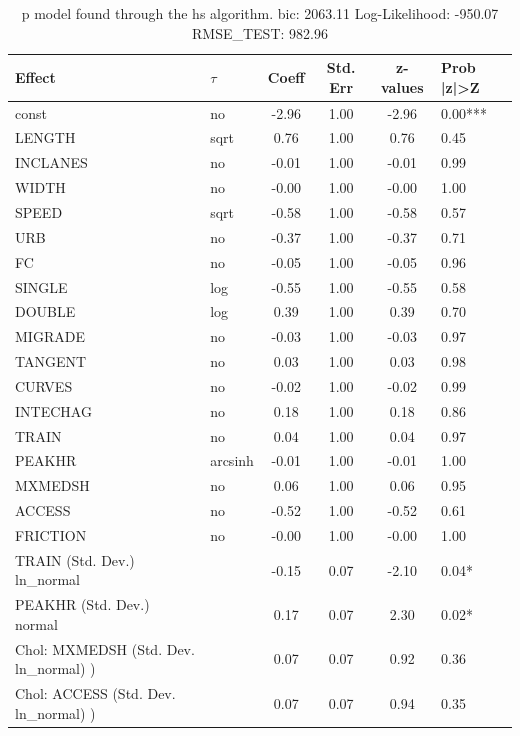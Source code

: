 \begin{table}
	\caption{p model found through the hs algorithm. bic: 2063.11 Log-Likelihood: -950.07 RMSE_TEST: 982.96}
	\begin{center}
		\begin{tabular}{|l|l|c|c|c|l|}
			\hline
			Effect & $\tau$ & Coeff & Std. Err & z-values & Prob |z|>Z \\
			\hline
			const & no & -2.96 & 1.00 & -2.96 & 0.00*** \\
			\hline
			LENGTH & sqrt & 0.76 & 1.00 & 0.76 & 0.45 \\
			\hline
			INCLANES & no & -0.01 & 1.00 & -0.01 & 0.99 \\
			\hline
			WIDTH & no & -0.00 & 1.00 & -0.00 & 1.00 \\
			\hline
			SPEED & sqrt & -0.58 & 1.00 & -0.58 & 0.57 \\
			\hline
			URB & no & -0.37 & 1.00 & -0.37 & 0.71 \\
			\hline
			FC & no & -0.05 & 1.00 & -0.05 & 0.96 \\
			\hline
			SINGLE & log & -0.55 & 1.00 & -0.55 & 0.58 \\
			\hline
			DOUBLE & log & 0.39 & 1.00 & 0.39 & 0.70 \\
			\hline
			MIGRADE & no & -0.03 & 1.00 & -0.03 & 0.97 \\
			\hline
			TANGENT & no & 0.03 & 1.00 & 0.03 & 0.98 \\
			\hline
			CURVES & no & -0.02 & 1.00 & -0.02 & 0.99 \\
			\hline
			INTECHAG & no & 0.18 & 1.00 & 0.18 & 0.86 \\
			\hline
			TRAIN & no & 0.04 & 1.00 & 0.04 & 0.97 \\
			\hline
			PEAKHR & arcsinh & -0.01 & 1.00 & -0.01 & 1.00 \\
			\hline
			MXMEDSH & no & 0.06 & 1.00 & 0.06 & 0.95 \\
			\hline
			ACCESS & no & -0.52 & 1.00 & -0.52 & 0.61 \\
			\hline
			FRICTION & no & -0.00 & 1.00 & -0.00 & 1.00 \\
			\hline
			TRAIN (Std. Dev.) ln_normal &  & -0.15 & 0.07 & -2.10 & 0.04* \\
			\hline
			PEAKHR (Std. Dev.) normal &  & 0.17 & 0.07 & 2.30 & 0.02* \\
			\hline
			 Chol: MXMEDSH (Std. Dev. ln_normal) ) &  & 0.07 & 0.07 & 0.92 & 0.36 \\
			\hline
			 Chol: ACCESS (Std. Dev. ln_normal) ) &  & 0.07 & 0.07 & 0.94 & 0.35 \\

\end{tabular}
\end{center}
\end{table}
